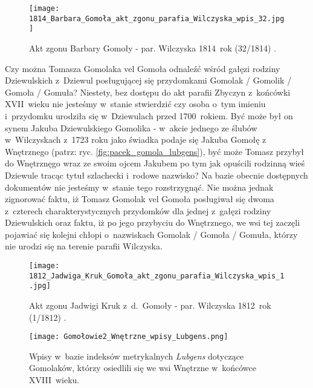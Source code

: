 \begin{figure}[!ht]
    \vspace*{0.5cm}
    \centering \texttt{[image: 
        1814\_Barbara\_Gomoła\_akt\_zgonu\_parafia\_Wilczyska\_wpis\_32.jpg]}
    \captionsetup{format=hang}
    \caption{Akt zgonu Barbary Gomoły - par. Wilczyska 1814~rok (32/1814) 
    \cite{par_wilczyska1}.}
    \label{fig:bgomola}
\end{figure}

Czy można Tomasza Gomolaka vel Gomoła odnaleźć wśród gałęzi rodziny 
Dziewulskich z~Dziewul posługującej się przydomkami Gomolak / Gomolik / 
Gomoła / Gomuła? Niestety, bez dostępu do akt parafii Zbyczyn z~końcówki 
XVII~wieku nie jesteśmy w~stanie stwierdzić czy osoba o~tym imieniu 
i~przydomku urodziła się w~Dziewulach przed 1700~rokiem. Być może był on 
synem Jakuba Dziewulskiego Gomolika - w~akcie jednego ze ślubów w~Wilczyskach 
z~1723 roku jako świadka podaje się Jakuba Gomołę z Wnętrznego (patrz: ryc. 
\ref{fig:pacek_gomola_lubgens}), być może Tomasz przybył do Wnętrznęgo wraz 
ze swoim ojcem Jakubem po tym jak opuścili rodzinną wieś Dziewule tracąc 
tytuł szlachecki i~rodowe nazwisko? Na bazie obecnie dostępnych dokumentów 
nie jesteśmy w~stanie tego rozstrzygnąć. Nie można jednak zignorować faktu, 
iż Tomasz Gomolak vel Gomoła posługiwał się dwoma z~czterech 
charakterystycznych przydomków dla jednej z~gałęzi rodziny Dziewulskich oraz 
faktu, iż po jego przybyciu do Wnętrznego, we wsi tej zaczęli pojawiać się 
kolejni chłopi o~nazwiskach Gomolak / Gomoła / Gomuła, którzy nie urodzi się 
na terenie parafii Wilczyska.

\begin{figure}[!ht]
    \vspace*{0.5cm}
    \centering \texttt{[image: 
        1812\_Jadwiga\_Kruk\_Gomoła\_akt\_zgonu\_parafia\_Wilczyska\_wpis\_1.jpg]}
    \captionsetup{format=hang}
    \caption{Akt zgonu Jadwigi Kruk z~d.~Gomoły - par. Wilczyska 1812~rok 
    (1/1812) \cite{par_wilczyska1}.}
    \label{fig:jgomola_1812}
\end{figure}

\begin{figure}[!ht]
    \vspace*{0.5cm}
    \centering \texttt{[image: 
        Gomołowie2\_Wnętrzne\_wpisy\_Lubgens.png]}
    \captionsetup{format=hang}
    \caption{Wpisy w~bazie indeksów metrykalnych \emph{Lubgens} dotyczące 
    Gomolaków, którzy osiedlili się we wsi Wnętrzne w~końcówce XVIII~wieku.}
    \label{fig:gomola2_lubgens}
\end{figure}

